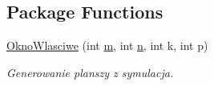 \subsection*{Package Functions}
\begin{DoxyCompactItemize}
\item 
\hyperlink{class_zadanie7_1_1_okno_wlasciwe_a09f8c68cad5eb49f7229c1141acfd832}{Okno\+Wlasciwe} (int \hyperlink{class_zadanie7_1_1_okno_wlasciwe_a2ac6a5aa6284f4835a12a68754ae80b8}{m}, int \hyperlink{class_zadanie7_1_1_okno_wlasciwe_a9def326ff03537e3e304e17fc99ab674}{n}, int k, int p)
\begin{DoxyCompactList}\small\item\em Generowanie planszy z symulacja. \end{DoxyCompactList}\end{DoxyCompactItemize}
